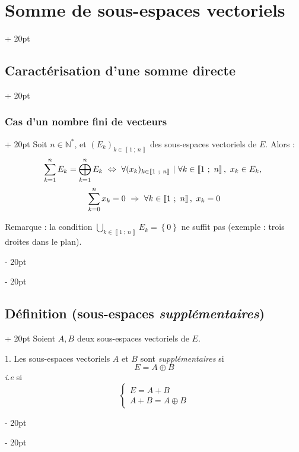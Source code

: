 \documentclass[a4paper, 12pt, twoside]{article}
\newcommand{\N}{\mathbb{N}} %
\newcommand{\nset}[2]{\left\llbracket #1\ ;\ #2 \right\rrbracket}
\newcommand{\set}[1]{\left\{ #1 \right\}}
\newcommand{\ssi}{\ \Leftrightarrow \ }
\newcommand{\eqsys}[2]{\begin{cases} #1 \\ #2 \end{cases}}
\newcommand{\ind}[1][20pt]{\advance\leftskip + #1}
\newcommand{\deind}[1][20pt]{\advance\leftskip - #1}
\newenvironment{indt}[2][20pt]{#2 \par \ind[#1]}{\par \deind} %
\begin{document}
\begin{indt}{\section{Somme de sous-espaces vectoriels}}
\begin{indt}{\subsection{Caractérisation d'une somme directe}}
            \begin{indt}{\subsubsection{Cas d'un nombre fini de vecteurs}}
                Soit $n \in \N^*$, et $(E_k)_{k \in \nset 1 n}$ des sous-espaces vectoriels de $E$. Alors :
                    \[
                        \begin{array}{c}
                            \displaystyle \sum_{k = 1}^n E_k = \bigoplus_{k = 1}^n E_k
                            \vspace{6pt}
                            \displaystyle
                            \ssi
                            \forall (x_k)_{k \in \nset 1 n}\ |\
                            \forall k \in \nset 1 n,\ x_k \in E_k,\
                            \\
                            \displaystyle
                            \sum_{k = 0}^n x_k = 0\ \Rightarrow\ \forall k \in \nset 1 n,\ x_k = 0
                        \end{array}
                    \]
                
                Remarque : la condition
                    $\displaystyle \bigcup_{k \in \nset 1 n} E_k = \set 0 $
                ne suffit pas (exemple : trois droites dans le plan).
            \end{indt}
        \end{indt}
        
        \vspace{12pt}
        
        \begin{indt}{\subsection{Définition (sous-espaces \textit{supplémentaires})}}
            Soient $A, B$ deux sous-espaces vectoriels de $E$.
            
            \vspace{6pt}
            
            1. Les sous-espaces vectoriels $A$ et $B$ sont \textit{supplémentaires} si
                \[ E = A \oplus B \]
            \textit{i.e} si
                \[ \eqsys{E = A + B}{A + B = A \oplus B} \]
            
            \vspace{12pt}
            

\end{indt}
\end{indt}
\end{document}
